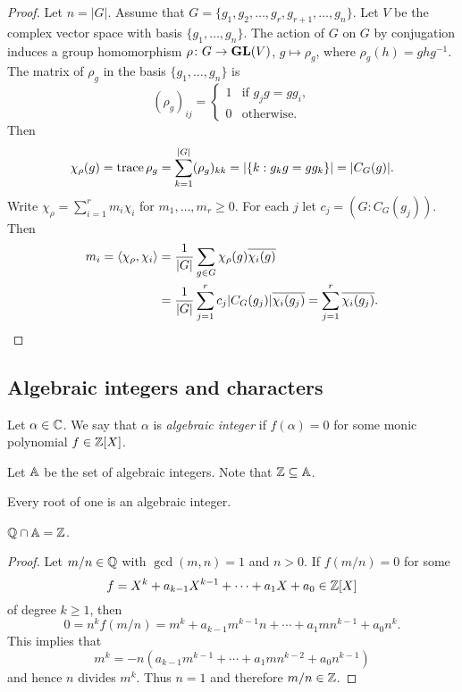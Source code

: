 \begin{proof}
    Let $n=|G|$. 
    Assume that $G=\{g_1,g_2,\dots,g_r,g_{r+1},\dots,g_n\}$. 
    Let $V$ be the complex vector space with basis $\{g_1,\dots,g_n\}$. 
    The action of $G$ on $G$ by conjugation induces a group homomorphism 
    $\rho\colon G\to\mathbf{GL}(V)$, $g\mapsto\rho_g$, where
    $\rho_g(h)=ghg^{-1}$. The matrix of $\rho_g$ 
    in the basis $\{g_1,\dots,g_n\}$ is
    \[
    (\rho_g)_{ij}=\begin{cases}
        1 & \text{if $g_jg=gg_i$},\\
        0 & \text{otherwise}.
        \end{cases}
    \]
    Then
    \[
    \chi_{\rho}(g)=\operatorname{trace}\rho_g=\sum_{k=1}^{|G|}(\rho_g)_{kk}
    =|\{k:g_kg=gg_k\}|=|C_G(g)|.
    \]
    Write $\chi_{\rho}=\sum_{i=1}^rm_i\chi_i$ for $m_1,\dots,m_r\geq0$. 
    For each $j$ let $c_j=(G:C_G(g_j))$. Then
    \begin{align*}
    m_i=\langle\chi_{\rho},\chi_i\rangle
    &=\frac{1}{|G|}\sum_{g\in G}\chi_{\rho}(g)\overline{\chi_i(g)}\\
    &=\frac{1}{|G|}\sum_{j=1}^r c_j|C_G(g_j)|\overline{\chi_i(g_j)}
    =\sum_{j=1}^r\overline{\chi_i(g_j)}.\qedhere
    \end{align*}
\end{proof}

\subsection{Algebraic integers and characters}

\begin{definition}
\label{Algebraic integer}
    Let $\alpha\in\mathbb{C}$. We say that $\alpha$ is \emph{algebraic integer}
    if $f(\alpha)=0$ for some monic polynomial $f\in\mathbb{Z}[X]$. 
\end{definition}

Let $\mathbb{A}$ be the set of algebraic integers. Note that $\mathbb{Z}\subseteq\mathbb{A}$. 

\begin{example}
    Every root of one is an algebraic integer.
\end{example}

\begin{proposition}
    $\mathbb{Q}\cap\mathbb{A}=\mathbb{Z}$. 
\end{proposition}

\begin{proof}
    Let $m/n\in\mathbb{Q}$ with $\gcd(m,n)=1$ and $n>0$. If 
    $f(m/n)=0$ for some 
    \[
    f=X^k+a_{k-1}X^{k-1}+\cdots+a_1X+a_0\in\mathbb{Z}[X]
    \]
    of degree $k\geq1$, then
    \[
    0=n^kf(m/n)=m^k+a_{k-1}m^{k-1}n+\cdots+a_1mn^{k-1}+a_0n^k.
    \]
    This implies that 
    \[
        m^k=-n\left(a_{k-1}m^{k-1}+\cdots+a_1mn^{k-2}+a_0n^{k-1}\right)
    \]
    and hence $n$ divides $m^k$. Thus $n=1$ and 
    therefore $m/n\in\mathbb{Z}$.
\end{proof}

